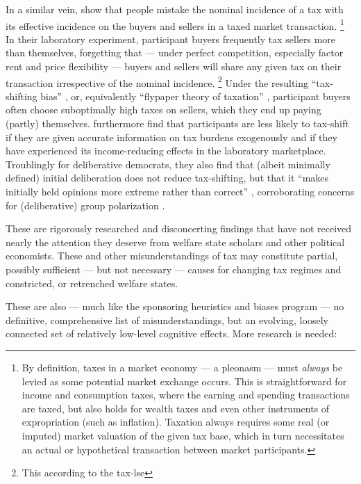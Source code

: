 In a similar vein, \cite{SausgruberTyran2011} show that people mistake the nominal incidence of a tax with its effective incidence on the buyers and sellers in a taxed market transaction.
\footnote{
	By definition, taxes in a market economy --- a pleonasm --- must \emph{always} be levied as some potential market exchange occurs.
	This is straightforward for income and consumption taxes, where the earning and spending transactions are taxed, but also holds for wealth taxes and even other instruments of expropriation (such as inflation).
	Taxation always requires some real (or imputed) market valuation of the given tax base, which in turn necessitates an actual or hypothetical transaction between market participants.
}
In their laboratory experiment, participant buyers frequently tax sellers more than themselves, forgetting that --- under perfect competition, especially factor rent and price flexibility --- buyers and sellers will share any given tax on their transaction irrespective of the nominal incidence.
\footnote{
	This according to the \gls{tax-lse}
}
Under the resulting ``tax-shifting bias'' \citep{SausgruberTyran2011}, or, equivalently ``flypaper theory of taxation'' \citep{McCafferyBaron2003}, participant buyers often choose suboptimally high taxes on sellers, which they end up paying (partly) themselves.
\citeauthor{SausgruberTyran2011} furthermore find that participants are less likely to tax-shift if they are given accurate information on tax burdens exogenously and if they have experienced its income-reducing effects in the laboratory marketplace.
Troublingly for deliberative democrats, they also find that (albeit minimally defined) initial deliberation does not reduce tax-shifting, but that it ``makes initially held opinions more extreme rather than correct'' \citeyearpar[164]{SausgruberTyran2011}, corroborating concerns for (deliberative) group polarization \citep{Sunstein1991}.

These are rigorously researched and disconcerting findings that have not received nearly the attention they deserve from welfare state scholars and other political economists.
These and other misunderstandings of tax may constitute partial, possibly sufficient --- but not necessary --- causes for changing tax regimes and constricted, or retrenched welfare states.

These are also --- much like the sponsoring heuristics and biases program --- no definitive, comprehensive list of misunderstandings, but an evolving, loosely connected set of relatively low-level cognitive effects.
More research is needed:

